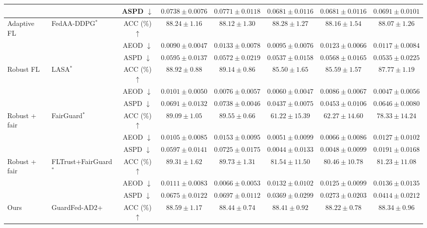 \begin{table}[t]
{\begin{tabular}{l|l|c|ccccc}
 &  & ASPD $\downarrow$ & $0.0738 \pm 0.0076$ & $0.0771 \pm 0.0118$ & $0.0681 \pm 0.0116$ & $0.0681 \pm 0.0116$ & $0.0691 \pm 0.0101$ \\
\hline
\multirow{3}{*}{Adaptive FL} & \multirow{3}{*}{FedAA-DDPG$^{*}$} & ACC (\%) $\uparrow$ & $88.24 \pm 1.16$ & $88.12 \pm 1.30$ & $88.28 \pm 1.27$ & $88.16 \pm 1.54$ & $88.07 \pm 1.26$ \\
 &  & AEOD $\downarrow$ & $0.0090 \pm 0.0047$ & $0.0133 \pm 0.0078$ & $0.0095 \pm 0.0076$ & $0.0123 \pm 0.0066$ & $0.0117 \pm 0.0084$ \\
 &  & ASPD $\downarrow$ & $0.0595 \pm 0.0137$ & $0.0572 \pm 0.0219$ & $0.0537 \pm 0.0158$ & $0.0568 \pm 0.0165$ & $0.0535 \pm 0.0225$ \\
\hline
\multirow{3}{*}{Robust FL} & \multirow{3}{*}{LASA$^{*}$} & ACC (\%) $\uparrow$ & $88.92 \pm 0.88$ & $89.14 \pm 0.86$ & $85.50 \pm 1.65$ & $85.59 \pm 1.57$ & $87.77 \pm 1.19$ \\
 &  & AEOD $\downarrow$ & $0.0101 \pm 0.0050$ & $0.0076 \pm 0.0057$ & $0.0060 \pm 0.0047$ & $0.0086 \pm 0.0067$ & $0.0047 \pm 0.0056$ \\
 &  & ASPD $\downarrow$ & $0.0691 \pm 0.0132$ & $0.0738 \pm 0.0046$ & $0.0437 \pm 0.0075$ & $0.0453 \pm 0.0106$ & $0.0646 \pm 0.0080$ \\
\hline
\multirow{3}{*}{Robust + fair} & \multirow{3}{*}{FairGuard$^{*}$} & ACC (\%) $\uparrow$ & $89.09 \pm 1.05$ & $89.55 \pm 0.66$ & $61.22 \pm 15.39$ & $62.27 \pm 14.60$ & $78.33 \pm 14.24$ \\
 &  & AEOD $\downarrow$ & $0.0105 \pm 0.0085$ & $0.0153 \pm 0.0095$ & $0.0051 \pm 0.0099$ & $0.0066 \pm 0.0086$ & $0.0127 \pm 0.0102$ \\
 &  & ASPD $\downarrow$ & $0.0597 \pm 0.0141$ & $0.0725 \pm 0.0175$ & $0.0044 \pm 0.0133$ & $0.0048 \pm 0.0099$ & $0.0191 \pm 0.0168$ \\
\hline
\multirow{3}{*}{Robust + fair} & \multirow{3}{*}{FLTrust+FairGuard$^{*}$} & ACC (\%) $\uparrow$ & $89.31 \pm 1.62$ & $89.73 \pm 1.31$ & $81.54 \pm 11.50$ & $80.46 \pm 10.78$ & $81.23 \pm 11.08$ \\
 &  & AEOD $\downarrow$ & $0.0111 \pm 0.0083$ & $0.0066 \pm 0.0053$ & $0.0132 \pm 0.0102$ & $0.0125 \pm 0.0099$ & $0.0136 \pm 0.0135$ \\
 &  & ASPD $\downarrow$ & $0.0675 \pm 0.0122$ & $0.0697 \pm 0.0112$ & $0.0369 \pm 0.0299$ & $0.0273 \pm 0.0203$ & $0.0414 \pm 0.0212$ \\
\hline
\multirow{3}{*}{Ours} & \multirow{3}{*}{GuardFed-AD2+} & ACC (\%) $\uparrow$ & $88.59 \pm 1.17$ & $88.44 \pm 0.74$ & $88.41 \pm 0.92$ & $88.22 \pm 0.78$ & $88.34 \pm 0.96$ \\

\end{tabular}}
\end{table}
